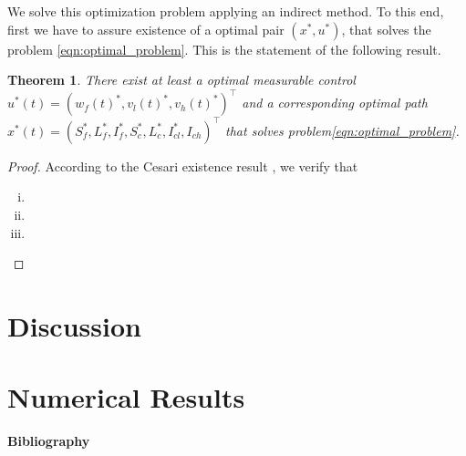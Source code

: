 \documentclass[preprint, 12pt]{elsarticle}
\newtheorem{theorem}{Theorem}
\begin{document}
        We solve this optimization problem applying an
    indirect method. To this end, first we
    have to assure existence of a optimal pair $(x^*, u^*)$,
    that solves the problem \eqref{eqn:optimal_problem}. This is the statement
    of the following result.

    \begin{theorem}
        There exist at least a optimal measurable control
        $
            u ^ * (t ) =(w_f(t) ^ *, v_l(t) ^ *, v_h(t) ^ * ) ^{\top}
        $ and a
        corresponding
        optimal path
        $
            x ^ *(t) =(
                S_f ^ *,
                L_f ^ *,
                I_f ^ *,
                S_c ^ *,
                L_c ^ *,
                I_{cl} ^ *,
                I_{ch}
            ) ^ {\top}
        $
        that solves problem\eqref{eqn:optimal_problem}.
    \end{theorem}
   \begin{proof}
        According to the Cesari existence result
        \cite[][p. 69 Col 4.2]{fleming2012}, we verify that
        \begin{enumerate}[(i)]
            \item
            \item
            \item
        \end{enumerate}
   \end{proof}

\section{Discussion}

\section{Numerical Results}

    

\textbf{Bibliography}


\end{document}
